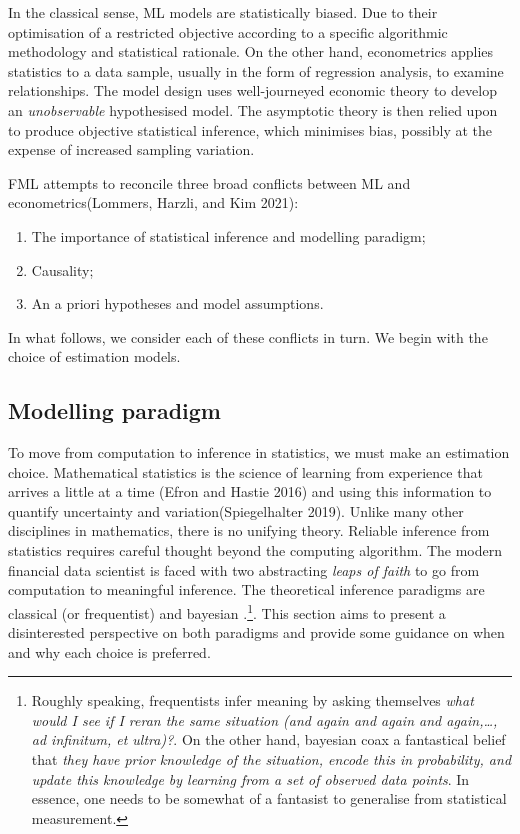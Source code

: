 \documentclass{article}
\begin{document}
In the classical sense, ML models are statistically biased. Due to their
optimisation of a restricted objective according to a specific
algorithmic methodology and statistical rationale. On the other hand,
econometrics applies statistics to a data sample, usually in the form of
regression analysis, to examine relationships. The model design uses
well-journeyed economic theory to develop an \emph{unobservable}
hypothesised model. The asymptotic theory is then relied upon to produce
objective statistical inference, which minimises bias, possibly at the
expense of increased sampling variation.

FML attempts to reconcile three broad conflicts between ML and
econometrics(Lommers, Harzli, and Kim 2021):

\begin{enumerate}
\def\labelenumi{\arabic{enumi}.}
\tightlist
\item
  The importance of statistical inference and modelling paradigm;
\item
  Causality;
\item
  An a priori hypotheses and model assumptions.
\end{enumerate}

In what follows, we consider each of these conflicts in turn. We begin
with the choice of estimation models.

\hypertarget{modelling-paradigm}{%
\subsection{Modelling paradigm}\label{modelling-paradigm}}

To move from computation to inference in statistics, we must make an
estimation choice. Mathematical statistics is the science of learning
from experience that arrives a little at a time (Efron and Hastie 2016)
and using this information to quantify uncertainty and
variation(Spiegelhalter 2019). Unlike many other disciplines in
mathematics, there is no unifying theory. Reliable inference from
statistics requires careful thought beyond the computing algorithm. The
modern financial data scientist is faced with two abstracting
\emph{leaps of faith} to go from computation to meaningful inference.
The theoretical inference paradigms are classical (or frequentist) and
bayesian .\footnote{Roughly speaking, frequentists infer meaning by
  asking themselves \emph{what would I see if I reran the same situation
  (and again and again and again,\ldots, ad infinitum, et ultra)?}. On
  the other hand, bayesian coax a fantastical belief that \emph{they
  have prior knowledge of the situation, encode this in probability, and
  update this knowledge by learning from a set of observed data points}.
  In essence, one needs to be somewhat of a fantasist to generalise from
  statistical measurement.}. This section aims to present a
disinterested perspective on both paradigms and provide some guidance on
when and why each choice is preferred.
\end{document}
